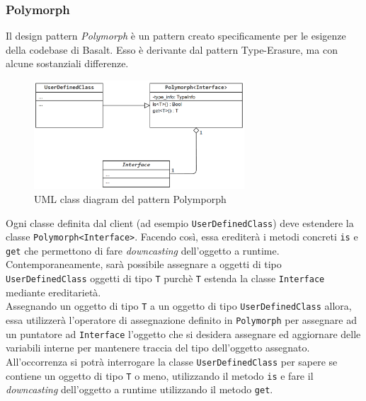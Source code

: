 
\subsubsection{Polymorph}
Il design pattern \textit{Polymorph} è un pattern creato specificamente per le esigenze della codebase di Basalt. Esso 
è derivante dal pattern Type-Erasure, ma con alcune sostanziali differenze. \\

\begin{figure}[H]
    \centering
        \includegraphics[width=0.7\textwidth]{../../Assets/Polymorph.png}
    \caption{UML class diagram del pattern Polymporph}
\end{figure}

Ogni classe definita dal client (ad esempio \texttt{UserDefinedClass}) deve estendere la classe \texttt{Polymorph<Interface>}. 
Facendo così, essa erediterà i metodi concreti \texttt{is} e \texttt{get} che permettono di fare \textit{downcasting}
dell'oggetto a runtime. \\

Contemporaneamente, sarà possibile assegnare a oggetti di tipo \texttt{UserDefinedClass} oggetti di tipo \texttt{T} purchè 
\texttt{T} estenda la classe \texttt{Interface} mediante ereditarietà. \\

Assegnando un oggetto di tipo \texttt{T} a un oggetto di tipo \texttt{UserDefinedClass} allora, essa utilizzerà l'operatore 
di assegnazione definito in \texttt{Polymorph} per assegnare ad un puntatore ad \texttt{Interface} l'oggetto che si desidera assegnare
ed aggiornare delle variabili interne per mantenere traccia del tipo dell'oggetto assegnato. \\

All'occorrenza si potrà interrogare la classe \texttt{UserDefinedClass} per sapere se contiene un oggetto di tipo \texttt{T}
o meno, utilizzando il metodo \texttt{is} e fare il \textit{downcasting} dell'oggetto a runtime utilizzando il metodo \texttt{get}. \\

